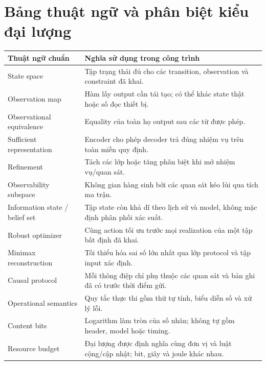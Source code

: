 \section{Bảng thuật ngữ và phân biệt kiểu đại lượng}
\begin{longtable}{p{}p{}}
\toprule Thuật ngữ chuẩn & Nghĩa sử dụng trong công trình\\\midrule\endhead
State space & Tập trạng thái đủ cho các transition, observation và constraint đã khai.\\
Observation map & Hàm lấy output cần tái tạo; có thể khác state thật hoặc số đọc thiết bị.\\
Observational equivalence & Equality của toàn họ output sau các từ được phép.\\
Sufficient representation & Encoder cho phép decoder trả đúng nhiệm vụ trên toàn miền quy định.\\
Refinement & Tách các lớp hoặc tăng phân biệt khi mở nhiệm vụ/quan sát.\\
Observability subspace & Không gian hàng sinh bởi các quan sát kéo lùi qua tích ma trận.\\
Information state / belief set & Tập state còn khả dĩ theo lịch sử và model, không mặc định phân phối xác suất.\\
Robust optimizer & Cùng action tối ưu trước mọi realization của một tập bất định đã khai.\\
Minimax reconstruction & Tối thiểu hóa sai số lớn nhất qua lớp protocol và tập input xác định.\\
Causal protocol & Mỗi thông điệp chỉ phụ thuộc các quan sát và bản ghi đã có trước thời điểm gửi.\\
Operational semantics & Quy tắc thực thi gồm thứ tự tính, biểu diễn số và xử lý lỗi.\\
Content bits & Logarithm làm tròn của số nhãn; không tự gồm header, model hoặc timing.\\
Resource budget & Đại lượng được định nghĩa cùng đơn vị và luật cộng/cập nhật; bit, giây và joule khác nhau.\\
\bottomrule
\end{longtable}
